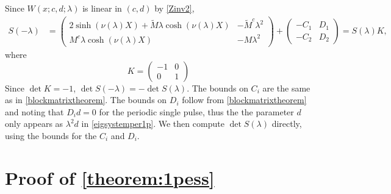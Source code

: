 \documentclass[thesis.tex]{subfiles}
\begin{document}
Since $W(x; c, d; \lambda)$ is linear in $(c, d)$ by \cref{Zinv2}, 
\begin{align}\label{1pdetSneg}
S(-\lambda) &= 
\begin{pmatrix}
2 \sinh(\nu(\lambda) X) + \tilde{M}\lambda \cosh(\nu(\lambda) X) & -\tilde{M}^c \lambda^2 \\
M^c \lambda \cosh(\nu(\lambda)X) & - M \lambda^2
\end{pmatrix} +
\begin{pmatrix}
-C_1 & D_1 \\ -C_2 & D_2
\end{pmatrix}
= S(\lambda) K,
\end{align}
where 
\[
K = \begin{pmatrix}-1 & 0 \\ 0 & 1 \end{pmatrix}
\]
Since $\det K = -1$, $\det S(-\lambda) = -\det S(\lambda)$. The bounds on $C_i$ are the same as in \cref{blockmatrixtheorem}. The bounds on $D_i$ follow from \cref{blockmatrixtheorem} and noting that $D_i d = 0$ for the periodic single pulse, thus the the parameter $d$ only appears as $\lambda^2 d$ in \cref{eigsystemper1p}. We then compute $\det S(\lambda)$ directly, using the bounds for the $C_i$ and $D_i$.

\section{Proof of \cref{theorem:1pess} }
\end{document}
